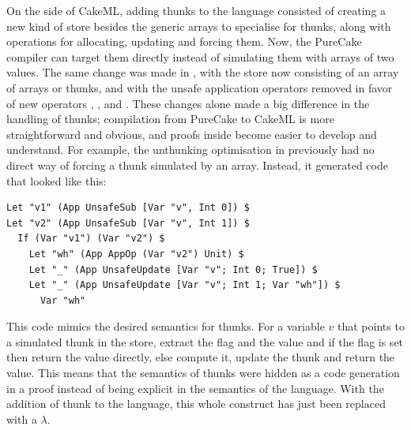 On the side of CakeML, adding thunks to the language consisted of creating a new
kind of store besides the generic arrays to specialise for thunks, along with
operations for allocating, updating and forcing them. Now, the PureCake compiler
can target them directly instead of simulating them with arrays of two values.
The same change was made in \StateLang{}, with the store now consisting of an
array of arrays or thunks, and with the unsafe application operators removed in
favor of new operators , , and
. These changes alone made a big difference in the handling
of thunks; compilation from PureCake to CakeML is more straightforward and
obvious, and proofs inside \StateLang{} become easier to develop and understand.
For example, the unthunking optimisation in \StateLang{} previously had no
direct way of forcing a thunk simulated by an array. Instead, it generated code
that looked like this:

\begin{verbatim}
Let "v1" (App UnsafeSub [Var "v", Int 0]) $
Let "v2" (App UnsafeSub [Var "v", Int 1]) $
  If (Var "v1") (Var "v2") $
    Let "wh" (App AppOp (Var "v2") Unit) $
    Let "_" (App UnsafeUpdate [Var "v"; Int 0; True]) $
    Let "_" (App UnsafeUpdate [Var "v"; Int 1; Var "wh"]) $
      Var "wh"
\end{verbatim}

This code mimics the desired semantics for thunks. For a variable $v$ that
points to a simulated thunk in the store, extract the flag and the value and if
the flag is set then return the value directly, else compute it, update the
thunk and return the value. This means that the semantics of thunks were hidden
as a code generation in a proof instead of being explicit in the semantics of
the language. With the addition of thunk to the language, this whole construct
has just been replaced with a $\lambda$.

